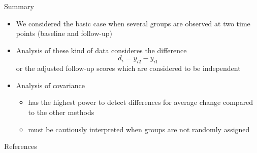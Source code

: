 \documentclass{beamer}
\begin{document}
\begin{frame}{Summary}
\begin{itemize}
  \item We considered the basic case when several groups are observed at
    two time points (baseline and follow-up)
  \item Analysis of these kind of data consideres the difference
    \[
        d_i = y_{i2} - y_{i1}
    \]
    or the adjusted follow-up scores which are considered to be independent
  \item Analysis of covariance
  \begin{itemize}
    \item has the highest power to detect differences for average change
      compared to the other methods
    \item must be cautiously interpreted when groups are not randomly
      assigned
  \end{itemize}
\end{itemize}
\end{frame}


% 
% 
% 

\appendix
\begin{frame}{References}
\renewcommand{\bibfont}{\footnotesize}


\vfill
\end{frame}
\end{document}
